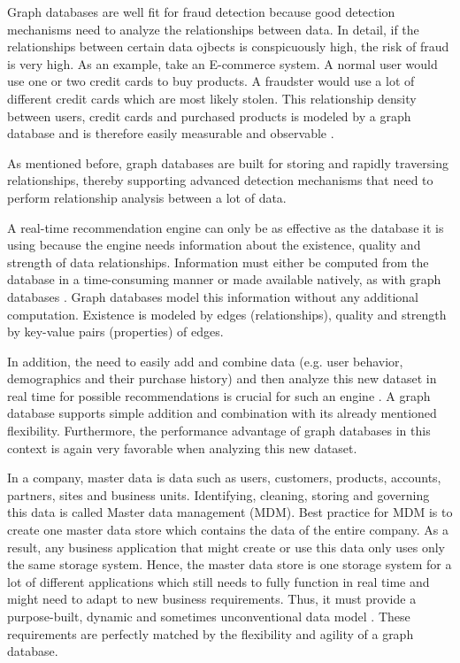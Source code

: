 Graph databases are well fit for fraud detection because good detection mechanisms need to analyze the relationships between data. In detail, if the relationships between certain data ojbects is conspicuously high, the risk of fraud is very high.  As an example, take an E-commerce system. A normal user would use one or two credit cards to buy products. A fraudster would use a lot of different credit cards which are most likely stolen. This relationship density between users, credit cards and purchased products is modeled by a graph database and is therefore easily measurable and observable \autocite{neo4j:use_cases}.

As mentioned before, graph databases are built for storing and rapidly traversing relationships, thereby supporting advanced detection mechanisms that need to perform relationship analysis between a lot of data.


A real-time recommendation engine can only be as effective as the database it is using because the engine needs information about the existence, quality and strength of data relationships. Information must either be computed from the database in a time-consuming manner or made available natively, as with graph databases \autocite{neo4j:use_cases}. Graph databases model this information without any additional computation. Existence is modeled by edges (relationships), quality and strength by key-value pairs (properties) of edges.

In addition, the need to easily add and combine data (e.g. user behavior, demographics and their purchase history) and then analyze this new dataset in real time for possible recommendations is crucial for such an engine \autocite{neo4j:use_cases}. A graph database supports simple addition and combination with its already mentioned flexibility. Furthermore, the performance advantage of graph databases in this context is again very favorable when analyzing this new dataset.


In a company, master data is data such as users, customers, products, accounts, partners, sites and business units. Identifying, cleaning, storing and governing this data is called Master data management (MDM). Best practice for MDM is to create one master data store which contains the data of the entire company. As a result, any business application that might create or use this data only uses only the same storage system. Hence, the master data store is one storage system for a lot of different applications which still needs to fully function in real time and might need to adapt to new business requirements. Thus, it must provide a purpose-built, dynamic and sometimes unconventional data model \autocite{neo4j:use_cases}. These requirements are perfectly matched by the flexibility and agility of a graph database.


